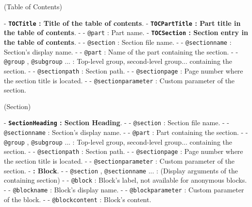 (\large Table of Contents){
    \par\medskip{}
    - \textbf{\texttt{TOCTitle} : Title of the table of contents}.
    - \textbf{\texttt{TOCPartTitle} : Part title in the table of contents}.
        - - \texttt{@part} : Part name.
    - \textbf{\texttt{TOCSection} : Section entry in the table of contents}.
        - - \texttt{@section} : Section file name.
        - - \texttt{@sectionname} : Section's display name.
        - - \texttt{@part} : Name of the part containing the section.
        - - \texttt{@group} , \texttt{@subgroup} ... : Top-level group, second-level group... containing the section.
        - - \texttt{@sectionpath} : Section path.
        - - \texttt{@sectionpage} : Page number where the section title is located.
        - - \texttt{@sectionparameter} : Custom parameter of the section.
}

(\large Section){
    \par\medskip{}
    - \textbf{\texttt{SectionHeading} : Section Heading}.
        - - \texttt{@section} : Section file name.
        - - \texttt{@sectionname} : Section's display name.
        - - \texttt{@part} : Part containing the section.
        - - \texttt{@group} , \texttt{@subgroup} ... : Top-level group, second-level group... containing the section.
        - - \texttt{@sectionpath} : Section path.
        - - \texttt{@sectionpage} : Page number where the section title is located.
        - - \texttt{@sectionparameter} : Custom parameter of the section.
    - \textbf{ : Block}.
        - - \texttt{@section} , \texttt{@sectionname} ... : (Display arguments of the containing section)
        - - \texttt{@block} : Block's label, not available for anonymous blocks.
        - - \texttt{@blockname} : Block's display name.
        - - \texttt{@blockparameter} : Custom parameter of the block.
        - - \texttt{@blockcontent} : Block's content.
}

\newpage

